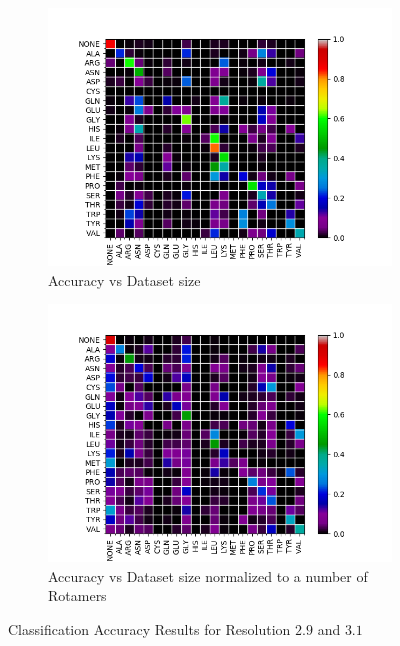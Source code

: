 \begin{figure}[!ht]
\begin{minipage}[b]{0.45\linewidth}
\begin{subfigure}[b]{\linewidth}
	\includegraphics[width=1.2\textwidth]{pics/CM_29_RR}
	\caption{Accuracy vs Dataset size \newline \newline}
	\label{f:CM_29_RR}
\end{subfigure}
\end{minipage}
\begin{minipage}[b]{0.45\linewidth}
\begin{subfigure}[b]{\linewidth}
	\includegraphics[width=1.2\textwidth]{pics/CM_31_RR.png}
	\caption{Accuracy vs Dataset size normalized to a number of Rotamers}
	\label{f:CM_31_RR}
\end{subfigure}
\end{minipage}
\caption{Classification Accuracy Results for Resolution $2.9$ and $3.1$ }
\end{figure}

